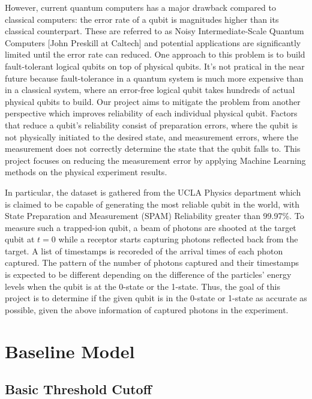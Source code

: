 \documentclass[letterpaper,twocolumn,10pt]{article}
\begin{document}
However, current quantum computers has a major drawback compared to classical computers: the error rate of a qubit is magnitudes higher than its classical counterpart. These are referred to as Noisy Intermediate-Scale Quantum Computers [John Preskill at Caltech] and potential applications are significantly limited until the error rate can reduced. One approach to this problem is to build fault-tolerant logical qubits on top of physical qubits. It's not pratical in the near future because fault-tolerance in a quantum system is much more expensive than in a classical system, where an error-free logical qubit takes hundreds of actual physical qubits to build. Our project aims to mitigate the problem from another perspective which improves reliability of each individual physical qubit. Factors that reduce a qubit's reliability consist of preparation errors, where the qubit is not physically initiated to the desired state, and measurement errors, where the measurement does not correctly determine the state that the qubit falls to. This project focuses on reducing the measurement error by applying Machine Learning methods on the physical experiment results.

In particular, the dataset is gathered from the UCLA Physics department which is claimed to be capable of generating the most reliable qubit in the world, with State Preparation and Measurement (SPAM) Reliability greater than 99.97\%. To measure such a trapped-ion qubit, a beam of photons are shooted at the target qubit at $t = 0$ while a receptor starts capturing photons reflected back from the target. A list of timestamps is recoreded of the arrival times of each photon captured. The pattern of the number of photons captured and their timestamps is expected to be different depending on the difference of the particles' energy levels when the qubit is at the 0-state or the 1-state. Thus, the goal of this project is to determine if the given qubit is in the 0-state or 1-state as accurate as possible, given the above information of captured photons in the experiment.

\section{Baseline Model}

\subsection{Basic Threshold Cutoff}
\end{document}
